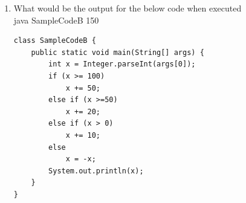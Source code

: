 \documentclass[11pt,a4paper]{article}
\def\AnswerBox{\fbox{\begin{minipage}{4in}\hfill\vspace{0.5in}\end{minipage}}}
\begin{document}
\begin{enumerate}
\item What would be the output for the below code when executed\\
    java SampleCodeB 150
\begin{lstlisting}
class SampleCodeB {
    public static void main(String[] args) {
        int x = Integer.parseInt(args[0]);
        if (x >= 100)
            x += 50;
        else if (x >=50)
            x += 20;
        else if (x > 0)
            x += 10;
        else 
            x = -x;
        System.out.println(x);
    }
}
\end{lstlisting}
\AnswerBox

\end{enumerate}
\end{document}
